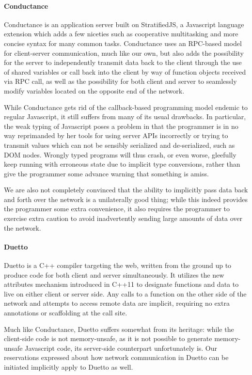 \documentclass[preprint]{sigplanconf}
\begin{document}
\paragraph{Conductance} Conductance is an application server built on
StratifiedJS, a Javascript language extension which adds a few niceties such as
cooperative multitasking and more concise syntax for many common tasks.
Conductance uses an RPC-based model for client-server communication, much like
our own, but also adds the possibility for the server to independently transmit
data back to the client through the use of shared variables or call back into
the client by way of function objects received via RPC call, as well as the
possibility for both client and server to seamlessly modify variables located
on the opposite end of the network.

While Conductance gets rid of the callback-based programming model endemic to
regular Javascript, it still suffers from many of its usual drawbacks. In
particular, the weak typing of Javascript poses a problem in that the
programmer is in no way reprimanded by her tools for using server APIs
incorrectly or trying to transmit values which can not be sensibly serialized
and de-serialized, such as DOM nodes. Wrongly typed programs will thus crash, or
even worse, gleefully keep running with erroneous state due to implicit type
conversions, rather than give the programmer some advance warning that something
is amiss.

We are also not completely convinced that the ability to implicitly pass data
back and forth over the network is a unilaterally good thing; while this indeed
provides the programmer some extra convenience, it also requires the programmer
to exercise extra caution to avoid inadvertently sending large amounts of data
over the network.

\paragraph{Duetto} Duetto is a C++ compiler targeting the web, written from
the ground up to produce code for both client and server simultaneously. It
utilizes the new attributes mechanism introduced in C++11 to designate
functions and data to live on either client or server side. Any calls to a
function on the other side of the network and attempts to access remote data
are implicit, requiring no extra annotations or scaffolding at the call site.

Much like Conductance, Duetto suffers somewhat from its heritage: while the
client-side code is not memory-unsafe, as it is not possible to generate
memory-unsafe Javascript code, its server-side counterpart unfortunately is.
Our reservations expressed about how network communication in Duetto can be
initiated implicitly apply to Duetto as well.
\end{document}
